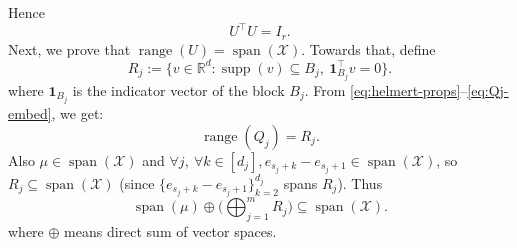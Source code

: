 Hence
\begin{equation}\label{eq:U-orth}
U^\top U = I_r.\nonumber
\end{equation}
Next, we prove that \(\operatorname{range}(U)=\operatorname{span}(\mathcal X)\). Towards that, define
\begin{equation}\label{eq:Uj-def}
R_j:=\Big\{v\in\mathbb R^d:\operatorname{supp}(v)\subseteq B_j,\ \mathbf 1_{B_j}^\top v=0\Big\}.\nonumber
\end{equation}
where $\mathbf 1_{B_j}$ is the indicator vector of the block $B_j$. From \eqref{eq:helmert-props}–\eqref{eq:Qj-embed}, we get:
\begin{equation}\label{eq:range-Qj}
\operatorname{range}(Q_j)=R_j.\nonumber
\end{equation}
Also \(\mu\in\operatorname{span}(\mathcal{X})\) and $\forall j,\ \forall k\in[d_j],
e_{s_j+k}-e_{s_j+1} \in \operatorname{span}(\mathcal{X})$, so \(R_j\subseteq \operatorname{span}(\mathcal X)\) (since \(\{e_{s_j+k}-e_{s_j+1}\}_{k=2}^{d_j}\) spans \(R_j\)). Thus
\begin{equation}\label{eq:span-inclusion-1}
\operatorname{span}(\mu)\oplus\Big(\bigoplus_{j=1}^m R_j\Big) \subseteq \operatorname{span}(\mathcal X).\nonumber
\end{equation}
where $\oplus$ means direct sum of vector spaces.

